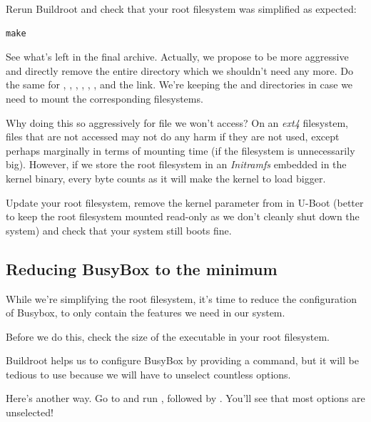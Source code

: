 Rerun Buildroot and check that your root filesystem was simplified as
expected:

\begin{verbatim}
make
\end{verbatim}

See what's left in the final archive. Actually, we propose to be more
aggressive and directly remove the entire  directory which we
shouldn't need any more. Do the same for , ,
, , , ,  and
the  link. We're keeping the  and 
directories in case we need to mount the corresponding filesystems.

Why doing this so aggressively for file we won't access? On an {\em
ext4} filesystem, files that are not accessed may not do any harm if
they are not used, except perhaps marginally in terms of mounting time
(if the filesystem is unnecessarily big). However, if we store the root
filesystem in an {\em Initramfs} embedded in the kernel binary,
every byte counts as it will make the kernel to load bigger.

Update your root filesystem, remove the  kernel parameter from
 in U-Boot (better to keep the root filesystem mounted read-only as we don't
cleanly shut down the system) and check that your system still boots fine.

\subsection{Reducing BusyBox to the minimum}

While we're simplifying the root filesystem, it's time to reduce the
configuration of Busybox, to only contain the features we need in our
system.

Before we do this, check the size of the  executable in
your root filesystem.

Buildroot helps us to configure BusyBox by providing a  command, but it will be tedious to use because we
will have to unselect countless options.

Here's another way. Go to  and run
, followed by . You'll see
that most options are unselected!

